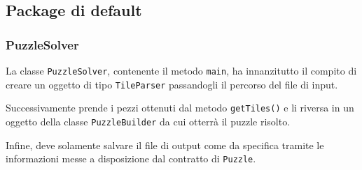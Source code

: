 \documentclass[a4paper, 12pt]{article}
\begin{document}
    \subsection{Package di default}

      \subsubsection{PuzzleSolver}

        La classe \verb|PuzzleSolver|, contenente il metodo \verb|main|, ha innanzitutto il compito di creare un oggetto di tipo \verb|TileParser| passandogli il percorso del file di input. 

        Successivamente prende i pezzi ottenuti dal metodo \verb|getTiles()| e li riversa in un oggetto della classe \verb|PuzzleBuilder| da cui otterrà il puzzle risolto.

        Infine, deve solamente salvare il file di output come da specifica tramite le informazioni messe a disposizione dal contratto di \verb|Puzzle|.
\end{document}
